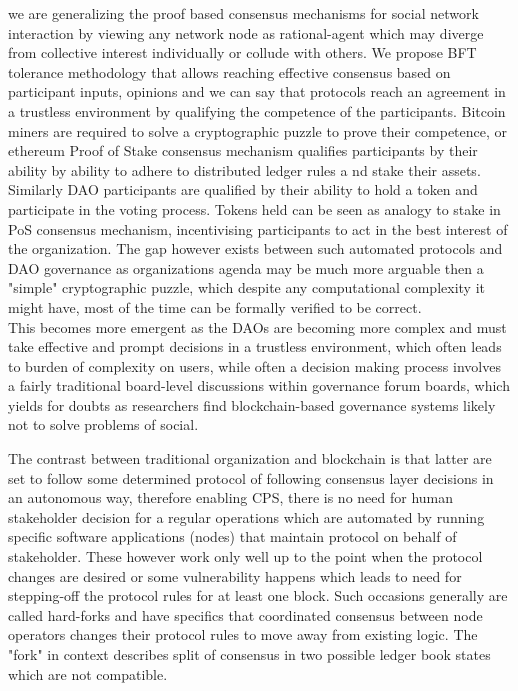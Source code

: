 \documentclass{article}
\begin{document}
\begin{CJK}{UTF8}{gbsn}
\begin{multicols}{2}
        we are generalizing the proof based consensus mechanisms for social network interaction by viewing any network node as rational-agent which may diverge from collective interest \cite{Philip2019} individually or collude with others. We propose BFT tolerance methodology that allows reaching effective consensus based on participant inputs, opinions and  we can say that protocols reach an agreement in a trustless environment by qualifying the competence of the participants. Bitcoin miners are required to solve a cryptographic puzzle to prove their competence, or ethereum Proof of Stake consensus mechanism qualifies participants by their ability by ability to adhere to distributed ledger rules a   nd stake their assets. \\ Similarly DAO participants are qualified by their ability to hold a token and participate in the voting process. Tokens held can be seen as analogy to stake in PoS consensus mechanism, incentivising participants to act in the best interest of the organization. The gap however exists between such automated protocols and DAO governance as organizations agenda may be much more arguable then a "simple" cryptographic puzzle, which despite any computational complexity it might have, most of the time can be formally verified to be correct.\\
        This becomes more emergent as the DAOs are becoming more complex and must take effective and prompt decisions in a trustless environment, which often leads to burden of complexity on users, while often a decision making process involves a fairly traditional board-level discussions within governance forum boards, which yields for doubts as researchers find blockchain-based governance systems likely not to solve problems of social.

        The contrast between traditional organization and blockchain is that latter are set to follow some determined protocol of following consensus layer decisions in an autonomous way, therefore enabling CPS, there is no need for human stakeholder decision for a regular operations which are automated by running specific software applications (nodes) that maintain protocol on behalf of stakeholder.
        These however work only well up to the point when the protocol changes are desired or some vulnerability happens which leads to need for stepping-off the protocol rules for at least one block. Such occasions generally are called hard-forks and have specifics that coordinated consensus between node operators changes their protocol rules to move away from existing logic. The "fork" in context describes split of consensus in two possible ledger book states which are not compatible.\
    \end{multicols}
    
    

    \clearpage\end{CJK}
\end{document}

